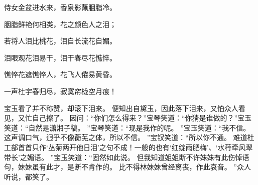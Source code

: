 \par
侍女金盆进水来，香泉影蘸胭脂冷。
\par
胭脂鲜艳何相类，花之颜色人之泪；\par
若将人泪比桃花，泪自长流花自媚。
\par
泪眼观花泪易干，泪干春尽花憔悴。
\par
憔悴花遮憔悴人，花飞人倦易黄昏。
\par
一声杜宇春归尽，寂寞帘栊空月痕！\par
\hop
宝玉看了并不称赞，却滚下泪来。
便知出自黛玉，因此落下泪来，又怕众人看见，又忙自己擦了。
因问：“你们怎么得来？”宝琴笑道：“你猜是谁做的？”宝玉笑道：“自然是潇湘子稿。
”宝琴笑道：“现是我作的呢。
”宝玉笑道：“我不信。
这声调口气，迥乎不像蘅芜之体，所以不信。
”宝钗笑道：“所以你不通。
难道杜工部首首只作‘丛菊两开他日泪’之句不成！一般的也有‘红绽雨肥梅’、‘水荇牵风翠带长’之媚语。
”宝玉笑道：“固然如此说。
但我知道姐姐断不许妹妹有此伤悼语句，妹妹虽有此才，是断不肯作的。
比不得林妹妹曾经离丧，作此哀音。
”众人听说，都笑了。
\par


